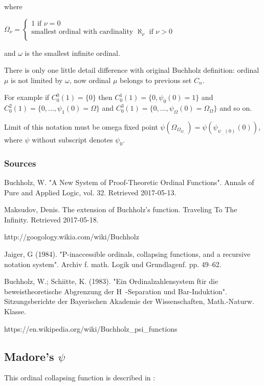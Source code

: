 \documentclass[10pt]{article}
\begin{document}
where

\(\Omega_\nu=\left\{\begin{array}{lcr} 1\text{ if }\nu=0\\ \text{smallest ordinal with cardinality }\aleph_\nu \text{ if }\nu>0\\ \end{array}\right.\)

and \(\omega\) is the smallest infinite ordinal.

There is only one little detail difference with original Buchholz definition: ordinal \(\mu\) is not limited by \(\omega\), now ordinal \(\mu\) belongs to previous set \(C_n\).

For example if \(C_0^0(1)=\{0\}\) then \(C_0^1(1)=\{0,\psi_0(0)=1\}\) and \(C_0^2(1)=\{0,...,\psi_1(0)=\Omega\}\) and \(C_0^3(1)=\{0,...,\psi_\Omega(0)=\Omega_\Omega\}\) and so on.

Limit of this notation must be omega fixed point \(\psi(\Omega_{\Omega_{\Omega_{...}}})=\psi(\psi_{\psi_{...}(0)}(0))\), where \(\psi\) without subscript denotes \(\psi_0\).

\subsubsection{Sources}

Buchholz, W. "A New System of Proof-Theoretic Ordinal Functions". Annals of Pure and Applied Logic, vol. 32. Retrieved 2017-05-13.

Maksudov, Denis. The extension of Buchholz's function. Traveling To The Infinity. Retrieved 2017-05-18.

http://googology.wikia.com/wiki/Buchholz%

Jaiger, G (1984). "P-inaccessible ordinals, collapsing functions, and a recursive notation system". Archiv f. math. Logik und Grundlagenf. pp. 49–62.

Buchholz, W.; Schiitte, K. (1983). "Ein Ordinalzahlensystem ftir die beweistheoretische Abgrenzung der H~-Separation und Bar-Induktion". Sitzungsberichte der Bayerischen Akademie der Wissenschaften, Math.-Naturw. Klasse.

https://en.wikipedia.org/wiki/Buchholz\_psi\_functions


\subsection{Madore's \( \psi \)}

This ordinal collapsing function is described in :
\end{document}
